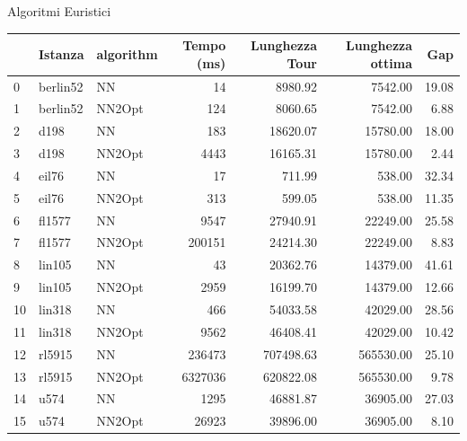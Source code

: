 \documentclass{beamer}
\begin{document}
\begin{frame}{Algoritmi Euristici}
    \begin{table}
        \centering
        \begin{tabular}{lllrrrr}
            \toprule
               & Istanza  & algorithm & Tempo (ms) & Lunghezza Tour & Lunghezza ottima & Gap   \\
            \midrule
            0  & berlin52 & NN        & 14         & 8980.92        & 7542.00          & 19.08 \\
            1  & berlin52 & NN2Opt    & 124        & 8060.65        & 7542.00          & 6.88  \\
            2  & d198     & NN        & 183        & 18620.07       & 15780.00         & 18.00 \\
            3  & d198     & NN2Opt    & 4443       & 16165.31       & 15780.00         & 2.44  \\
            4  & eil76    & NN        & 17         & 711.99         & 538.00           & 32.34 \\
            5  & eil76    & NN2Opt    & 313        & 599.05         & 538.00           & 11.35 \\
            6  & fl1577   & NN        & 9547       & 27940.91       & 22249.00         & 25.58 \\
            7  & fl1577   & NN2Opt    & 200151     & 24214.30       & 22249.00         & 8.83  \\
            8  & lin105   & NN        & 43         & 20362.76       & 14379.00         & 41.61 \\
            9  & lin105   & NN2Opt    & 2959       & 16199.70       & 14379.00         & 12.66 \\
            10 & lin318   & NN        & 466        & 54033.58       & 42029.00         & 28.56 \\
            11 & lin318   & NN2Opt    & 9562       & 46408.41       & 42029.00         & 10.42 \\
            12 & rl5915   & NN        & 236473     & 707498.63      & 565530.00        & 25.10 \\
            13 & rl5915   & NN2Opt    & 6327036    & 620822.08      & 565530.00        & 9.78  \\
            14 & u574     & NN        & 1295       & 46881.87       & 36905.00         & 27.03 \\
            15 & u574     & NN2Opt    & 26923      & 39896.00       & 36905.00         & 8.10  \\
            \bottomrule
        \end{tabular}
    \end{table}
\end{frame}
\end{document}
